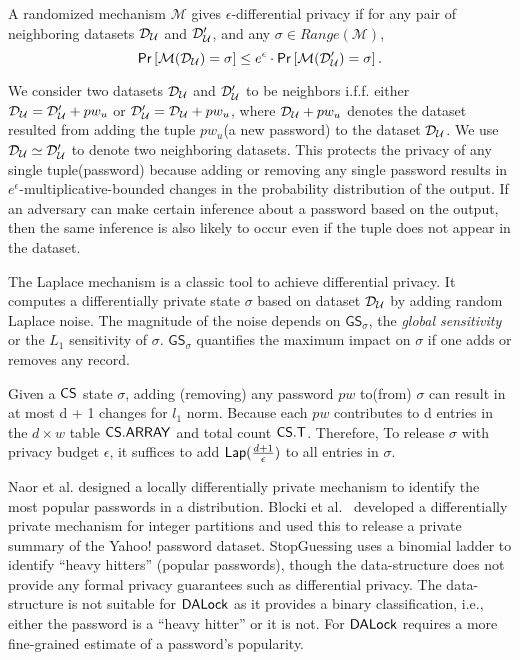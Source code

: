 \begin{definition} \label{def:diff}

	A randomized mechanism $\mathcal{M}$ gives $\epsilon$-differential privacy if for any pair of neighboring datasets $\mathcal{D}_{{\mathcal{U}}}$ and $\mathcal{D}_{{\mathcal{U}}}'$, and any $\sigma \in \mathit{Range}(\mathcal{M})$,
	$$\mathsf{Pr} \left[\mathcal{M}(\mathcal{D}_{{\mathcal{U}}})=\sigma\right]  \leq e^{\epsilon}\cdot \mathsf{Pr} \left[\mathcal{M}(\mathcal{D}_{{\mathcal{U}}}')=\sigma\right] .$$
\end{definition}


We consider two datasets $\mathcal{D}_{{\mathcal{U}}}$ and $\mathcal{D}_{{\mathcal{U}}}'$ to be neighbors i.f.f. either $\mathcal{D}_{{\mathcal{U}}}=\mathcal{D}_{{\mathcal{U}}}' + pw_u$ or $\mathcal{D}_{{\mathcal{U}}}'=\mathcal{D}_{{\mathcal{U}}} + pw_u$, where $\mathcal{D}_{{\mathcal{U}}} +pw_u$ denotes the dataset resulted from adding the tuple $pw_u$(a new password) to the dataset $\mathcal{D}_{{\mathcal{U}}}$. We use $\mathcal{D}_{{\mathcal{U}}}\simeq \mathcal{D}_{{\mathcal{U}}}'$ to denote two neighboring datasets. This protects the privacy of any single tuple(password) because adding or removing any single password results in $e^{\epsilon}$-multiplicative-bounded changes in the probability distribution of the output. If an adversary can make certain inference about a password based on the output, then the same inference is also likely to occur even if the tuple does not appear in the dataset.


The Laplace mechanism is a classic tool to achieve differential privacy. It computes a differentially private state $\sigma$ based on dataset $\mathcal{D}_{{\mathcal{U}}}$ by adding random Laplace noise. The magnitude of the noise depends on $\mathsf{GS}_\sigma$, the \emph{global sensitivity} or the $L_1$ sensitivity of $\sigma$.  $\mathsf{GS}_\sigma$ quantifies the maximum impact on $\sigma$ if one adds or removes any record. 


 Given a $\mathsf{CS}$ state $\sigma$, adding (removing) any password $pw$ to(from) $\sigma$ can result in at most d + 1 changes for $l_1$ norm. Because each $pw$ contributes to d entries in the $d \times w$ table $\mathsf{CS.ARRAY}$ and total count $\mathsf{CS.T}$. Therefore, To release $\sigma$ with privacy budget $\epsilon$, it suffices to add $\mathsf{Lap}(\frac{d+1}{\epsilon})$ to all entries in $\sigma$. 

 Naor et al.\cite{CCS:NaoPinRon19} designed a locally differentially private mechanism to identify the most popular passwords in a distribution. Blocki et al.~\cite{NDSS:BloDatBon16} developed a differentially private mechanism for integer partitions and used this to release a private summary of the Yahoo! password dataset. StopGuessing\cite{EuroSP:THS19} uses a binomial ladder to identify ``heavy hitters'' (popular passwords), though the data-structure does not provide any formal privacy guarantees such as differential privacy. The data-structure is not suitable for $\mathsf{DALock}$ as it provides a binary classification, i.e., either the password is a ``heavy hitter'' or it is not. For $\mathsf{DALock}$ requires a more fine-grained estimate of a password’s popularity. 

